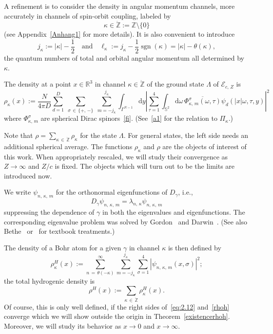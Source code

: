 \documentclass[AHL,Unicode,longabstracts,published]{cedram}
\DeclareMathOperator{\sgn}{sgn}
\newcommand*\rd{\mathrm{d}}
\newcommand{\bbS}{\mathbb{S}}
\newcommand*\gz{\mathbb{Z}}
\newcommand*\rz{\mathbb{R}}
\newcommand*\zp{\dot{\gz}}
\newcommand*\cE{\mathcal{E}}
\begin{document}
A refinement is to consider the density in angular momentum channels, more accurately in channels of spin-orbit coupling, labeled by
\begin{equation}\label{zp}
\kappa\in\zp:=\gz\setminus\{0\}
\end{equation}
(see Appendix~\ref{Anhang1} for more details). It is also convenient to introduce
\begin{equation}\label{l}
j_\kappa:=|\kappa|-\frac12\quad \text{and}\quad
\ell_\kappa:= j_\kappa-\frac12\sgn(\kappa)= |\kappa|-\theta(\kappa),
\end{equation}
the quantum numbers of total and orbital angular momentum all determined by $\kappa$.

The density at a point $x\in\rz^3$ in channel $\kappa\in\zp$ of the ground state $\Lambda$ of $\cE_{c,\,Z}$ is
\begin{equation}\label{eq:furryangdensity}
\rho_{\kappa}(x):= \frac{N}{4\pi D}\sum_{d=1}^D\;\sum_{\sigma\,\in\,\{+,\,-\}}\;\sum_{m=-j_\kappa}^{j_\kappa}\int_{\Gamma^{N-1}}\rd y
\left|\sum_{\tau=1}^4\int_{\bbS^2}\rd \omega\,
\overline{\Phi_{\kappa,\,m}^\sigma(\omega,\tau)}
\psi_d(|x|\omega,\tau,y)\right|^2
\end{equation}
where $\Phi^\sigma_{\kappa,\,m}$ are spherical Dirac spinors~\eqref{fi}. (See~\eqref{a1} for the relation to $\Pi_\kappa$.)

Note that $\rho=\sum_{\kappa\,\in\,\zp}\rho_\kappa$ for the state $\Lambda$. For general states, the left side needs an additional spherical average. The functions $\rho_\kappa$ and $\rho$ are the objects of interest of this work. When appropriately rescaled, we will study their convergence as $Z\to\infty$ and $Z/c$ is fixed. The objects which will turn out to be the limits are introduced now.

We write $\psi_{n,\,\kappa,\,m}$ for the orthonormal eigenfunctions of $D_\gamma$, i.e.,
\begin{equation}\label{eigenfunktion}
D_\gamma\psi_{n,\,\kappa,\,m}=\lambda_{n,\,\kappa}\psi_{n,\,\kappa,\,m}
\end{equation}
suppressing the dependence of $\gamma$ in both the eigenvalues and eigenfunctions. The corresponding eigenvalue problem was solved by Gordon~\cite{Gordon1928} and Darwin~\cite{Darwin1928}. (See also Bethe~\cite[Formula~(9.29)]{Bethe1933} or~\cite[Formula~(7.140)]{Thaller1992} for textbook treatments.)

The density of a Bohr atom for a given $\gamma$ in channel $\kappa$ is then defined by
\begin{equation}\label{eq:2.12}
\rho_{\kappa}^H(x) := \sum_{n\,=\,\theta(-\kappa)}^\infty\sum_{m=-j_\kappa}^{j_\kappa}
\sum_{\sigma=1}^4\left|\psi_{n,\,\kappa,\,m}(x,\sigma)\right|^2;
\end{equation}
the total hydrogenic density is
\begin{equation}\label{rhoh}
\rho^H(x) := \sum_{\kappa\,\in\,\zp}\rho_\kappa^H(x).
\end{equation}
Of course, this is only well defined, if the right sides of~\eqref{eq:2.12} and~\eqref{rhoh} converge which we will show outside the origin in Theorem~\ref{existencerhoh}. Moreover, we will study its behavior as $x\to0$ and $x\to\infty$.
\end{document}
